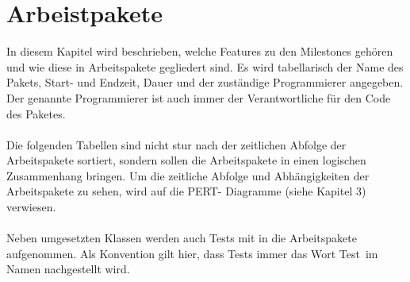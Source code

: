 \chapter{Arbeistpakete}
In diesem Kapitel wird beschrieben, welche Features zu den Milestones gehören und wie diese in Arbeitspakete gegliedert sind. Es
wird tabellarisch der Name des Pakets, Start- und Endzeit, Dauer und der zuständige
Programmierer angegeben. Der genannte Programmierer ist auch immer der Verantwortliche
für den Code des Paketes.\\
\ \\
Die folgenden Tabellen sind nicht stur nach der zeitlichen Abfolge der Arbeitspakete sortiert,
sondern sollen die Arbeitspakete in einen logischen Zusammenhang bringen. Um die
zeitliche Abfolge und Abhängigkeiten der Arbeitspakete zu sehen, wird auf die PERT-
Diagramme (siehe Kapitel 3) verwiesen.\\
\ \\
Neben umgesetzten Klassen werden auch Tests mit in die Arbeitspakete aufgenommen.
Als Konvention gilt hier, dass Tests immer das Wort
\glqq Test\grqq \ im Namen nachgestellt wird.



